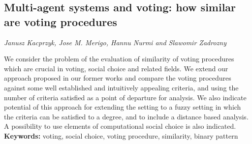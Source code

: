 \documentclass[../booklet.tex]{subfiles}
\begin{document}
\subsection[Multi-agent systems and voting: how similar are voting procedures. {\it Janusz Kacprzyk, Jose M. Merigo, Hannu Nurmi and Slawomir Zadrozny}]{Multi-agent systems and voting: how similar are voting procedures}
   

\begin{center}
  {\it Janusz Kacprzyk, Jose M. Merigo, Hannu Nurmi and Slawomir Zadrozny}
\end{center}

\vskip 0.8cm


We consider the problem of the evaluation of similarity of voting procedures which are crucial in voting, social choice and related fields. We extend our approach 
proposed in our former works and compare the voting procedures against some well established and intuitively appealing 
criteria, and using the number of criteria satisfied as a point of departure for analysis. We also indicate potential of this approach for 
extending the setting to a fuzzy setting in which the criteria can be satisfied to a degree, and to include  a distance based analysis. A possibility to use elements of computational social choice is also indicated.\\[0.5cm]
\textbf{Keywords:} voting, social choice, voting procedure, similarity, binary pattern
\end{document}
